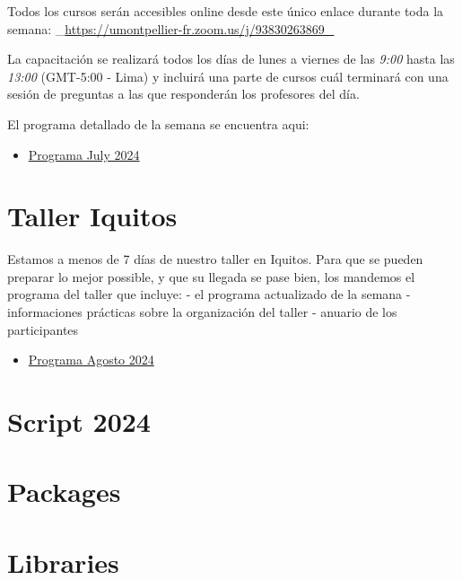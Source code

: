 \documentclass[
]{book}
\providecommand{\tightlist}{%
  \setlength{\itemsep}{0pt}\setlength{\parskip}{0pt}}
\begin{document}
Todos los cursos serán accesibles online desde este único enlace durante toda la semana: \_\url{https://umontpellier-fr.zoom.us/j/93830263869_}

La capacitación se realizará todos los días de lunes a viernes de las \emph{9:00} hasta las \emph{13:00} (GMT-5:00 - Lima) y incluirá una parte de cursos cuál terminará con una sesión de preguntas a las que responderán los profesores del día.

El programa detallado de la semana se encuentra aqui:

\begin{itemize}
\tightlist
\item
  \href{programa/Programa_july2024.pdf}{Programa July 2024}
\end{itemize}

\hypertarget{taller-iquitos}{%
\section{Taller Iquitos}\label{taller-iquitos}}

Estamos a menos de 7 días de nuestro taller en Iquitos. Para que se pueden preparar lo mejor possible, y que su llegada se pase bien, los mandemos el programa del taller que incluye:
- el programa actualizado de la semana
- informaciones prácticas sobre la organización del taller
- anuario de los participantes

\begin{itemize}
\tightlist
\item
  \href{programa/Programa_METAMAZON_Agosto_2024.pdf}{Programa Agosto 2024}
\end{itemize}

\hypertarget{script-2024}{%
\section{Script 2024}\label{script-2024}}

\hypertarget{packages}{%
\section*{Packages}\label{packages}}

\hypertarget{libraries}{%
\section*{Libraries}\label{libraries}}
\end{document}
